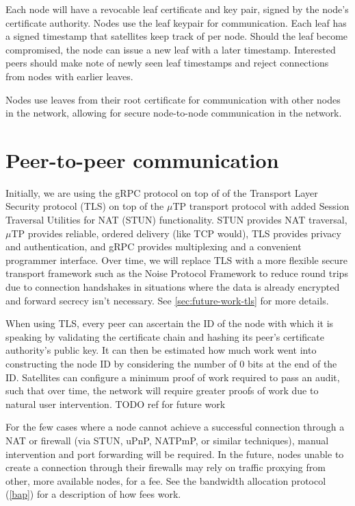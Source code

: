 \documentclass[11pt,fleqn,openany]{book}
\newcommand{\todo}[1]{{\color{red} TODO #1 }}
\begin{document}
Each node will have a revocable leaf certificate and key pair, signed by
the node's certificate authority. Nodes use the leaf keypair for
communication. Each leaf has a signed timestamp that satellites
keep track of per node. Should the leaf become compromised, the node can issue
a new leaf with a later timestamp. Interested peers should make note of newly
seen leaf timestamps and reject connections from nodes with earlier leaves.

Nodes use leaves from their root certificate for communication with other
nodes in the network, allowing for secure node-to-node communication in the network.

\section{Peer-to-peer communication}

Initially, we are using the gRPC \cite{grpc} protocol on top of of the
Transport Layer Security protocol (TLS) on top of the $\mu$TP
\cite{utp} transport protocol with added Session Traversal Utilities for NAT
(STUN) functionality. STUN provides NAT traversal, $\mu$TP provides reliable,
ordered delivery (like TCP would), TLS provides privacy and authentication,
and gRPC provides multiplexing and a convenient programmer interface.
Over time, we will replace TLS with a more flexible secure transport
framework such as the Noise Protocol Framework \cite{noise-proto} to
reduce round trips due to connection handshakes in situations where the data is
already encrypted and forward secrecy isn't necessary. See
\ref{sec:future-work-tls} for more details.

When using TLS, every peer can ascertain the ID of the node with which it is
speaking by validating the certificate chain and hashing its peer's
certificate authority's public key. It can then be estimated how much work went
into constructing the node ID by considering the number of 0 bits at the end of
the ID. Satellites can configure a minimum proof of work required to pass an
audit, such that over time, the network will require greater proofs of work
due to natural user intervention. \todo{ref for future work}

For the few cases where a node cannot achieve a successful connection through a
NAT or firewall (via STUN, uPnP, NATPmP, or similar techniques), manual
intervention and port forwarding will be required. In the future, nodes unable
to create a connection through their firewalls may rely on traffic proxying from
other, more available nodes, for a fee. See the bandwidth allocation protocol
(\ref{bap}) for a description of how fees work.
\end{document}

